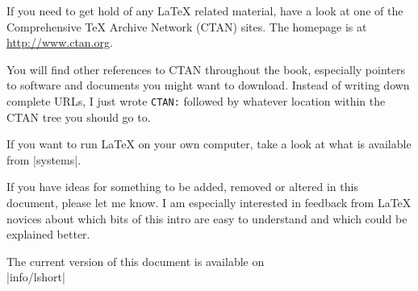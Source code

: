 \bigskip
\noindent If you need to get hold of any \LaTeX{} related material,
have a look at one of the Comprehensive \TeX{} Archive Network
(CTAN) sites. The homepage is at
\url{http://www.ctan.org}.

You will find other references to CTAN throughout the book, especially
pointers to software and documents you might want to download. Instead
of writing down complete URLs, I just wrote \texttt{CTAN:} followed by
whatever location within the CTAN tree you should go to.

If you want to run \LaTeX{} on your own computer, take a look at what
is available from \CTAN|systems|.

\noindent If you have ideas for something to be
added, removed or altered in this document, please let me know. I am
especially interested in feedback from \LaTeX{} novices about which
bits of this intro are easy to understand and which could be explained
better.

\bigskip
\begin{verse}
\end{verse}
\noindent The current version of this document is available on\\
\CTAN|info/lshort|

\endinput

%


